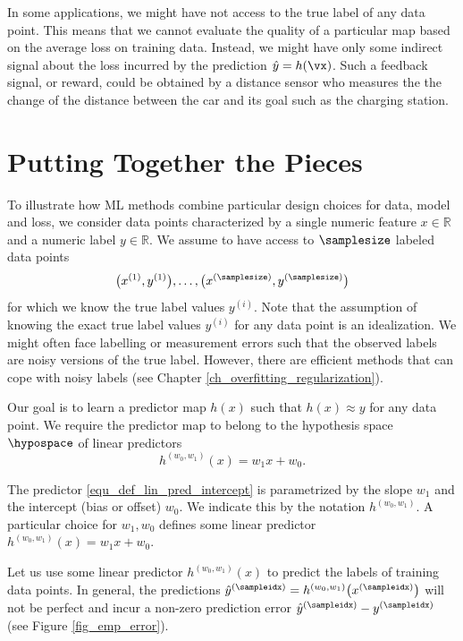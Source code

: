 \documentclass[12pt]{report}
\begin{document}
In some applications, we might have not access to the true label of any 
data point. This means that we cannot evaluate the quality of a particular 
map based on the average loss on training data. Instead, we might have 
only some indirect signal about the loss incurred by the prediction 
$\hat{y}=h(\vx)$. Such a feedback signal, or reward, could be obtained 
by a distance sensor who measures the the change of the distance 
between the car and its goal such as the charging station. 

\section{Putting Together the Pieces} 
\label{sec_putting_togehter_the_pieces}

To illustrate how ML methods combine particular design choices for 
data, model and loss, we consider data points characterized by a single 
numeric feature $x \in \mathbb{R}$ and a numeric label $y \in \mathbb{R}$. 
We assume to have access to $\samplesize$ labeled data points 
\begin{equation} 
\big(x^{(1)},y^{(1)}\big),\ldots, \big(x^{(\samplesize)},y^{(\samplesize)}\big)  \label{equ_labeled_data_putting_together}
\end{equation} 
for which we know the true label values $y^{(i)}$. Note that the assumption of knowing 
the exact true label values $y^{(i)}$ for any data point is an idealization. We might often 
face labelling or measurement errors such that the observed labels are noisy versions 
of the true label. However, there are efficient methods that can cope with noisy 
labels (see Chapter \ref{ch_overfitting_regularization}). 

Our goal is to learn a predictor map $h(x)$ such that $h(x) \approx y$ for any data point. 
We require the predictor map to belong to the hypothesis space $\hypospace$ of 
linear predictors 
\begin{equation} 
\label{equ_def_lin_pred_intercept}
h^{(w_{0},w_{1})}(x) = w_{1} x + w_{0}. 
\end{equation}

The predictor \eqref{equ_def_lin_pred_intercept} is parametrized by the slope 
$w_{1}$ and the intercept (bias or offset) $w_{0}$. We indicate this by the 
notation $h^{(w_{0},w_{1})}$. A particular choice for $w_{1},w_{0}$ 
defines some linear predictor $h^{(w_{0},w_{1})}(x) = w_{1}x +w_{0}$. 

Let us use some linear predictor $h^{(w_{0},w_{1})}(x)$ to predict the labels of 
training data points. In general, the predictions $\hat{y}^{(\sampleidx)} = h^{(w_{0},w_{1})}\big(x^{(\sampleidx)}\big)$ 
will not be perfect and incur a non-zero prediction error $\hat{y}^{(\sampleidx)} - y^{(\sampleidx)}$ (see Figure \ref{fig_emp_error}).  
\end{document}
